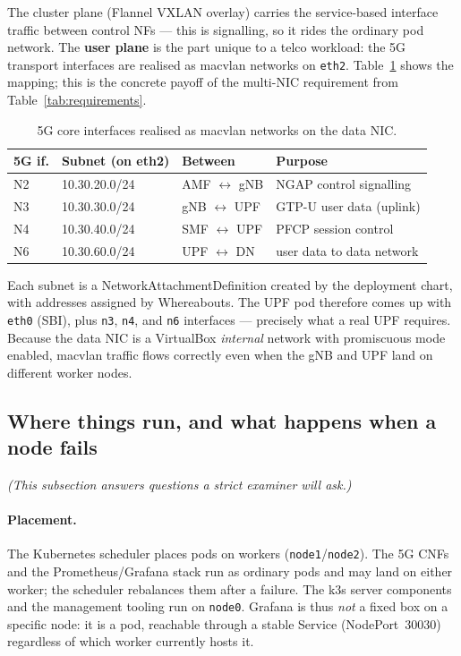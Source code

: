 The cluster plane (Flannel VXLAN overlay) carries the service-based interface
traffic between control NFs --- this is signalling, so it rides the ordinary
pod network. The \textbf{user plane} is the part unique to a telco workload:
the 5G transport interfaces are realised as macvlan networks on \texttt{eth2}.
Table~\ref{tab:5gif} shows the mapping; this is the concrete payoff of the
multi-NIC requirement from Table~\ref{tab:requirements}.

\begin{table}[H]
\centering
\begin{tabular}{lllp{}}
\toprule
\textbf{5G if.} & \textbf{Subnet (on eth2)} & \textbf{Between} & \textbf{Purpose} \\
\midrule
N2 & 10.30.20.0/24 & AMF $\leftrightarrow$ gNB & NGAP control signalling \\
N3 & 10.30.30.0/24 & gNB $\leftrightarrow$ UPF & GTP-U user data (uplink) \\
N4 & 10.30.40.0/24 & SMF $\leftrightarrow$ UPF & PFCP session control \\
N6 & 10.30.60.0/24 & UPF $\leftrightarrow$ DN  & user data to data network \\
\bottomrule
\end{tabular}
\caption{5G core interfaces realised as macvlan networks on the data NIC.}
\label{tab:5gif}
\end{table}

Each subnet is a NetworkAttachmentDefinition created by the deployment chart,
with addresses assigned by Whereabouts. The UPF pod therefore comes up with
\texttt{eth0} (SBI), plus \texttt{n3}, \texttt{n4}, and \texttt{n6}
interfaces --- precisely what a real UPF requires. Because the data NIC is a
VirtualBox \emph{internal} network with promiscuous mode enabled, macvlan
traffic flows correctly even when the gNB and UPF land on different worker
nodes.

\subsection{Where things run, and what happens when a node fails}

\emph{(This subsection answers questions a strict examiner will ask.)}

\paragraph{Placement.} The Kubernetes scheduler places pods on workers
(\texttt{node1}/\texttt{node2}). The 5G CNFs and the Prometheus/Grafana stack
run as ordinary pods and may land on either worker; the scheduler rebalances
them after a failure. The k3s server components and the management tooling run
on \texttt{node0}. Grafana is thus \emph{not} a fixed box on a specific node: it
is a pod, reachable through a stable Service (NodePort~30030) regardless of
which worker currently hosts it.

